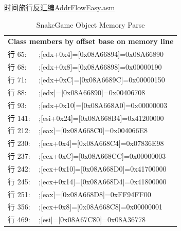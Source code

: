 \documentclass[AutoFakeBold,AutoFakeSlant]{beamer}
\begin{document}
\begin{frame}[fragile]
    \href{URL}{时间旅行反汇编AddrFlowEasy.asm} \\

    \scriptsize
    \begin{table}[htbp] %
        \centering %
        \caption{SnakeGame Object Memory Parse}
        \begin{tabular}{p{1cm}p{5cm}}
            \toprule
            \multicolumn{2}{l}{\textbf{Class members by offset base on memory line}} \\
            行  65: & ;[edx+0x4]=[0x08A66894]=0x08A66890                              \\
            行  68: & ;[edx+0x8]=[0x08A66898]=0x00000190                              \\
            行  71: & ;[edx+0xC]=[0x08A6689C]=0x00000150                              \\
            行  88: & ;[edx]=[0x08A66890]=0x00406708                                  \\
            行  93: & ;[edx+0x10]=[0x08A668A0]=0x00000003                             \\
            行 141: & ;[esi+0x24]=[0x08A668B4]=0x41200000                             \\
            行 212: & ;[eax]=[0x08A668C0]=0x004066E8                                  \\
            行 230: & ;[ecx+0x4]=[0x08A668C4]=0x07836E98                              \\
            行 237: & ;[ecx+0xC]=[0x08A668CC]=0x00000003                              \\
            行 242: & ;[ecx+0x10]=[0x08A668D0]=0x41700000                             \\
            行 245: & ;[ecx+0x14]=[0x08A668D4]=0x41800000                             \\
            行 251: & ;[eax]=[0x08A668D8]=0xFF94FF00                                  \\
            行 356: & ;[ecx+0x8]=[0x08A668C8]=0x00000001                              \\
            行 469: & ;[esi]=[0x08A67C80]=0x08A36778                                  \\
        \end{tabular}
    \end{table}
\end{frame}
\end{document}

